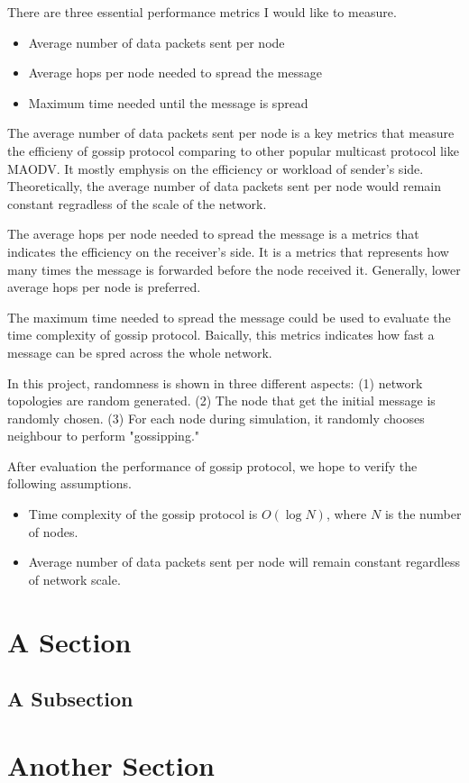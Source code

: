 

There are three essential performance metrics I would like to measure. 

\begin{itemize}
	\item Average number of data packets sent per node
	\item Average hops per node needed to spread the message
	\item Maximum time needed until the message is spread
\end{itemize}

The average number of data packets sent per node is a key metrics that measure the efficieny of gossip protocol comparing to other popular multicast protocol like MAODV. It mostly emphysis on the efficiency or workload of sender's side. Theoretically, the average number of data packets sent per node would remain constant regradless of the scale of the network. 

The average hops per node needed to spread the message is a metrics that indicates the efficiency on the receiver's side. It is a metrics that represents how many times the message is forwarded before the node received it. Generally, lower average hops per node is preferred. 

The maximum time needed to spread the message could be used to evaluate the time complexity of gossip protocol. Baically, this metrics indicates how fast a message can be spred across the whole network.  

In this project, randomness is shown in three different aspects: (1) network topologies are random generated. (2) The node that get the initial message is randomly chosen. (3) For each node during simulation, it randomly chooses neighbour to perform "gossipping." 

After evaluation the performance of gossip protocol, we hope to verify the following assumptions.
\begin{itemize}
	\item Time complexity of the gossip protocol is $O(\log N)$, where $N$ is the number of nodes.
	\item Average number of data packets sent per node will remain constant regardless of network scale.
\end{itemize}


\section{A Section}



\subsection{A Subsection}



\section{Another Section}
